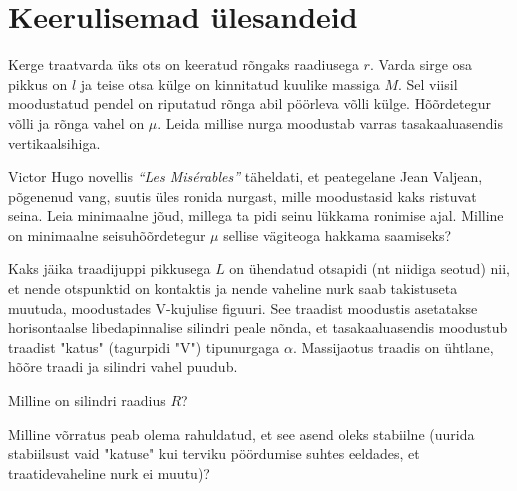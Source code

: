 \documentclass[a4paper,11pt,twocolumn]{article}
\begin{document}
\section{Keerulisemad ülesandeid}
\begin{question}[sta3][2.2cm]
	Kerge traatvarda üks ots on keeratud rõngaks raadiusega $r$. Varda sirge osa pikkus on $l$ ja teise otsa külge on kinnitatud kuulike massiga $M$. Sel viisil moodustatud pendel on riputatud rõnga abil pöörleva võlli külge. Hõõrdetegur võlli ja rõnga vahel on $\mu$. Leida millise nurga moodustab varras tasakaaluasendis vertikaalsihiga.
\end{question}
\begin{question}[200PPP, P10]
	Victor Hugo novellis \textit{\enquote{Les Misérables}} täheldati, et peategelane Jean Valjean, põgenenud vang, suutis üles ronida nurgast, mille moodustasid kaks ristuvat seina. Leia minimaalne jõud, millega ta pidi seinu lükkama ronimise ajal. Milline on minimaalne seisuhõõrdetegur $ \mu $ sellise vägiteoga hakkama saamiseks?
\end{question}
\begin{question}[Lõppv 2017, G9]
	Kaks jäika traadijuppi pikkusega $L$ on ühendatud otsapidi (nt niidiga seotud) nii, et nende otspunktid on kontaktis ja nende vaheline nurk saab takistuseta muutuda, moodustades V-kujulise figuuri. See traadist moodustis asetatakse horisontaalse libedapinnalise silindri peale nõnda, et tasakaaluasendis moodustub traadist "katus" (tagurpidi "V") tipunurgaga $\alpha$. Massijaotus traadis on ühtlane, hõõre traadi ja silindri vahel puudub.
	\begin{subquestion}
		\item Milline on silindri raadius $R$?
		\item Milline võrratus peab olema rahuldatud, et see asend oleks stabiilne (uurida stabiilsust vaid "katuse" kui terviku pöördumise suhtes eeldades, et traatidevaheline nurk ei muutu)?
	\end{subquestion}
\end{question}
\end{document}
